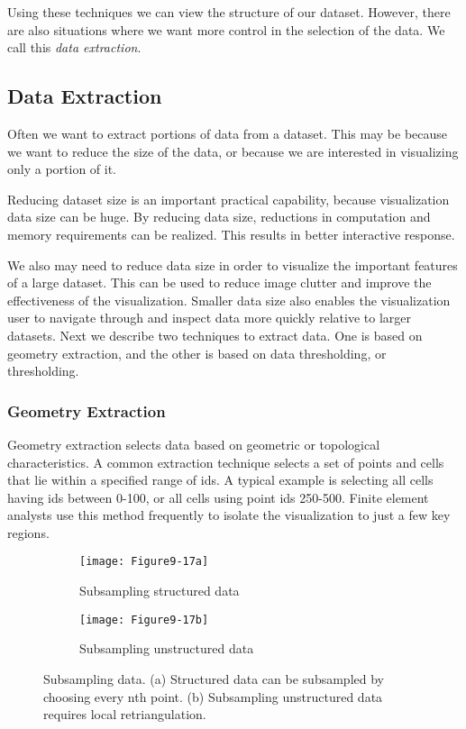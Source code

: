 Using these techniques we can view the structure of our dataset. However, there are also situations where we want more control in the selection of the data. We call this \emph{data extraction}.

\subsection{Data Extraction}

Often we want to extract portions of data from a dataset. This may be because we want to reduce the size of the data, or because we are interested in visualizing only a portion of it.

Reducing dataset size is an important practical capability, because visualization data size can be huge. By reducing data size, reductions in computation and memory requirements can be realized. This results in better interactive response.

We also may need to reduce data size in order to visualize the important features of a large dataset. This can be used to reduce image clutter and improve the effectiveness of the visualization. Smaller data size also enables the visualization user to navigate through and inspect data more quickly relative to larger datasets. Next we describe two techniques to extract data. One is based on geometry extraction, and the other is based on data thresholding, or thresholding.

\subsubsection{Geometry Extraction}

Geometry extraction selects data based on geometric or topological characteristics. A common extraction technique selects a set of points and cells that lie within a specified range of ids. A typical example is selecting all cells having ids between 0-100, or all cells using point ids 250-500. Finite element analysts use this method frequently to isolate the visualization to just a few key regions.

\begin{figure}[htb]
	\begin{subfigure}[h]{0.48\linewidth}
		\texttt{[image: Figure9-17a]}
		\captionsetup{justification=centering}
		\caption{Subsampling structured data}
		\label{fig:Figure9-17a}
	\end{subfigure}
	\hfill
	\begin{subfigure}[h]{0.48\linewidth}
		\texttt{[image: Figure9-17b]}
		\captionsetup{justification=centering}
		\caption{Subsampling unstructured data}
		\label{fig:Figure9-17b}
	\end{subfigure}
	\caption{Subsampling data. (a) Structured data can be subsampled by choosing every nth point. (b) Subsampling unstructured data requires local retriangulation.}\label{fig:Figure9-17}
\end{figure}


